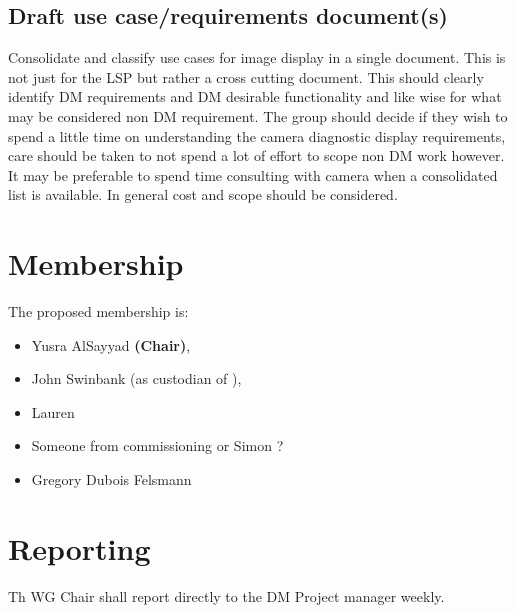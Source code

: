 \subsection{Draft use case/requirements document(s)}
Consolidate and classify use cases for image display in a single document. This is not just for the \gls{LSP} but rather a cross cutting document. This should clearly identify \gls{DM} requirements and \gls{DM} desirable functionality and like wise for what may be considered non \gls{DM} requirement.
The group should decide if they wish to spend a little time on understanding the camera diagnostic display requirements, care should be taken to not spend a lot of effort to scope non \gls{DM} work however. It may be preferable to spend time consulting with camera when a consolidated list is available.
In general cost and scope should be considered.


\section{Membership}

The proposed membership is:

\begin{itemize}
  \item Yusra AlSayyad \textbf{(Chair)},
  \item John Swinbank (as custodian of ),
  \item Lauren
  \item Someone from commissioning or Simon ?
  \item Gregory Dubois Felsmann
\end{itemize}

\section{Reporting}

Th \gls{WG} Chair shall report directly to the \gls{DM} Project manager weekly.

